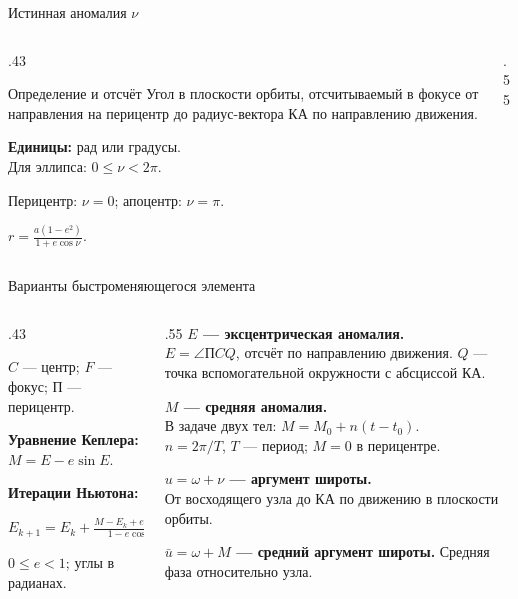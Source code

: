 \documentclass[11pt,aspectratio=169,t]{beamer}
\begin{document}
\begin{frame}{Истинная аномалия $\nu$}
\begin{columns}[T,onlytextwidth]
\begin{column}{.43\textwidth}
\begin{block}{Определение и отсчёт}
\justifying
Угол в плоскости орбиты, отсчитываемый в фокусе от направления на перицентр до радиус-вектора КА по направлению движения.
\end{block}
\textbf{Единицы:} рад или градусы.\\
Для эллипса: $0\le\nu<2\pi$.
\par
Перицентр: $\nu=0$; апоцентр: $\nu=\pi$.
\par
$\displaystyle r=\frac{a(1-e^2)}{1+e\cos\nu}$.
\end{column}
\begin{column}{.55\textwidth}
\centering

\end{column}
\end{columns}
\end{frame}

\begin{frame}{Варианты быстроменяющегося элемента}
\begin{columns}[T,onlytextwidth]
\begin{column}{.43\textwidth}
\centering
{

}
\par
{\color{coursemuted}$C$ --- центр; $F$ --- фокус; П --- перицентр.\par}
{\textbf{Уравнение Кеплера:}} $M=E-e\sin E$.\par
\textbf{Итерации Ньютона:}\par
$\displaystyle E_{k+1}=E_k+\frac{M-E_k+e\sin E_k}{1-e\cos E_k}.$\par
{\color{coursemuted}$0\le e<1$; углы в радианах.\par}
\end{column}
\begin{column}{.55\textwidth}
\textbf{$E$ --- эксцентрическая аномалия.}\\
$E=\angle\text{П}CQ$, отсчёт по направлению движения. $Q$ --- точка вспомогательной окружности с абсциссой КА.
\par\smallskip
\textbf{$M$ --- средняя аномалия.}\\
В задаче двух тел: $M=M_0+n(t-t_0)$.\\
$n=2\pi/T$, $T$ --- период; $M=0$ в перицентре.
\par\smallskip
\textbf{$u=\omega+\nu$ --- аргумент широты.}\\
От восходящего узла до КА по движению в плоскости орбиты.
\par\smallskip
\textbf{$\bar u=\omega+M$ --- средний аргумент широты.} Средняя фаза относительно узла.
\end{column}
\end{columns}
\end{frame}
\end{document}
